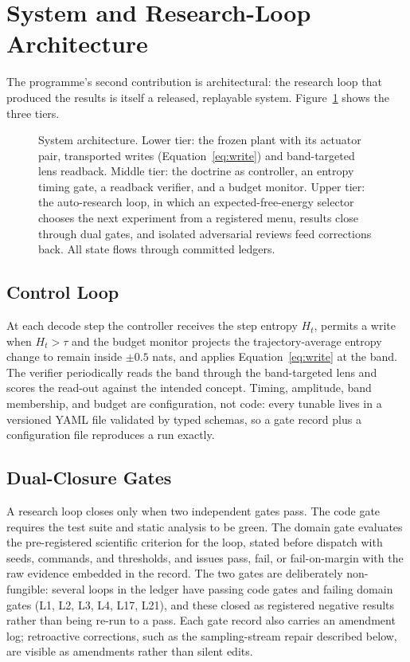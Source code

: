 \section{System and Research-Loop Architecture}
\label{sec:system}

The programme's second contribution is architectural: the research loop that produced the results is itself a released, replayable system. Figure~\ref{fig:architecture} shows the three tiers.

\begin{figure}[t]
\centering
\resizebox{\columnwidth}{!}{}
\caption{System architecture. Lower tier: the frozen plant with its actuator pair, transported writes (Equation~\ref{eq:write}) and band-targeted lens readback. Middle tier: the doctrine as controller, an entropy timing gate, a readback verifier, and a budget monitor. Upper tier: the auto-research loop, in which an expected-free-energy selector chooses the next experiment from a registered menu, results close through dual gates, and isolated adversarial reviews feed corrections back. All state flows through committed ledgers.}
\label{fig:architecture}
\end{figure}

\subsection{Control Loop}

At each decode step the controller receives the step entropy $H_t$, permits a write when $H_t > \tau$ and the budget monitor projects the trajectory-average entropy change to remain inside $\pm0.5$ nats, and applies Equation~\ref{eq:write} at the band. The verifier periodically reads the band through the band-targeted lens and scores the read-out against the intended concept. Timing, amplitude, band membership, and budget are configuration, not code: every tunable lives in a versioned YAML file validated by typed schemas, so a gate record plus a configuration file reproduces a run exactly.

\subsection{Dual-Closure Gates}

A research loop closes only when two independent gates pass. The code gate requires the test suite and static analysis to be green. The domain gate evaluates the pre-registered scientific criterion for the loop, stated before dispatch with seeds, commands, and thresholds, and issues pass, fail, or fail-on-margin with the raw evidence embedded in the record. The two gates are deliberately non-fungible: several loops in the ledger have passing code gates and failing domain gates (L1, L2, L3, L4, L17, L21), and these closed as registered negative results rather than being re-run to a pass. Each gate record also carries an amendment log; retroactive corrections, such as the sampling-stream repair described below, are visible as amendments rather than silent edits.

